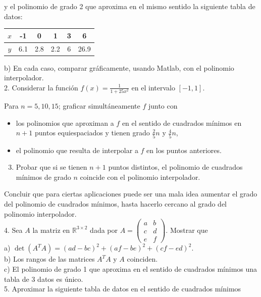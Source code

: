 \documentclass[10pt]{book}
\begin{document}
y el polinomio de grado 2 que aproxima en el mismo sentido la siguiente tabla de datos:

\begin{center}
\begin{tabular}{|c|c|c|c|c|c|}
\hline
$x$ & -1 & 0 & 1 & 3 & 6 \\
\hline
$y$ & 6.1 & 2.8 & 2.2 & 6 & 26.9 \\
\hline
\end{tabular}
\end{center}

b) En cada caso, comparar gráficamente, usando Matlab, con el polinomio interpolador.\\
2. Considerar la función $f(x)=\frac{1}{1+25 x^{2}}$ en el intervalo $[-1,1]$.

Para $n=5,10,15$; graficar simultáneamente $f$ junto con

\begin{itemize}
  \item los polinomios que aproximan a $f$ en el sentido de cuadrados mínimos en $n+1$ puntos equiespaciados y tienen grado $\frac{2}{5} n$ y $\frac{4}{5} n$,
  \item el polinomio que resulta de interpolar a $f$ en los puntos anteriores.
\end{itemize}

\begin{enumerate}
  \setcounter{enumi}{2}
  \item Probar que si se tienen $n+1$ puntos distintos, el polinomio de cuadrados mínimos de grado $n$ coincide con el polinomio interpolador.
\end{enumerate}

Concluir que para ciertas aplicaciones puede ser una mala idea aumentar el grado del polinomio de cuadrados mínimos, hasta hacerlo cercano al grado del polinomio interpolador.\\
4. Sea $A$ la matriz en $\mathbb{R}^{3 \times 2}$ dada por $A=\left(\begin{array}{ll}a & b \\ c & d \\ e & f\end{array}\right)$. Mostrar que\\
a) $\operatorname{det}\left(A^{T} A\right)=(a d-b c)^{2}+(a f-b e)^{2}+(c f-e d)^{2}$.\\
b) Los rangos de las matrices $A^{T} A$ y $A$ coinciden.\\
c) El polinomio de grado 1 que aproxima en el sentido de cuadrados mínimos una tabla de 3 datos es único.\\
5. Aproximar la siguiente tabla de datos en el sentido de cuadrados mínimos
\end{document}

